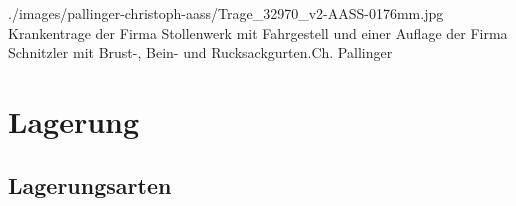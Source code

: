 
{}
{}
{./images/pallinger-christoph-aass/Trage_32970_v2-AASS-0176mm.jpg}
{Krankentrage der Firma Stollenwerk{\texttrademark} mit
Fahrgestell und einer Auflage der Firma
Schnitzler{\texttrademark} mit Brust-, Bein- und
Rucksackgurten.}{Ch. Pallinger}








\clearpage %
\section{Lagerung}
\subsection{Lagerungsarten}
\label{topic:lagerungsarten}


